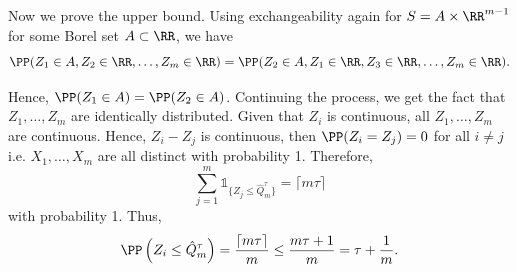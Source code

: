 Now we prove the upper bound. Using exchangeability again for $S=A\times\RR^{m-1}$ for some Borel set $A\subset \RR$, we have
$$\PP(Z_1\in A, Z_2\in\RR,\ldots,Z_m\in\RR) = \PP(Z_2\in A, Z_1\in\RR,Z_3\in\RR,\ldots,Z_m\in\RR).$$

Hence, $\PP(Z_1\in A) = \PP(Z_2\in A)$. Continuing the process, we get the fact that $Z_1,\ldots,Z_m$ are identically distributed. Given that $Z_i$ is continuous, all $Z_1,\ldots,Z_m$ are continuous. Hence, $Z_i-Z_j$ is continuous, then $\PP(Z_i=Z_j)=0$ for all $i\ne j$ i.e. $X_1,\ldots,X_m$ are all distinct with probability 1. Therefore,
$$\sum_{j=1}^{m} \mathds{1}_{\{Z_j\le \hat{Q}^{\tau}_m\}} = \lceil m\tau\rceil$$
with probability 1. Thus,
$$\PP\left(Z_i \le \hat{Q}^{\tau}_m\right) = \dfrac{\lceil m\tau\rceil}{m} \le \dfrac{m\tau+1}{m} = \tau + \dfrac{1}{m}.$$

